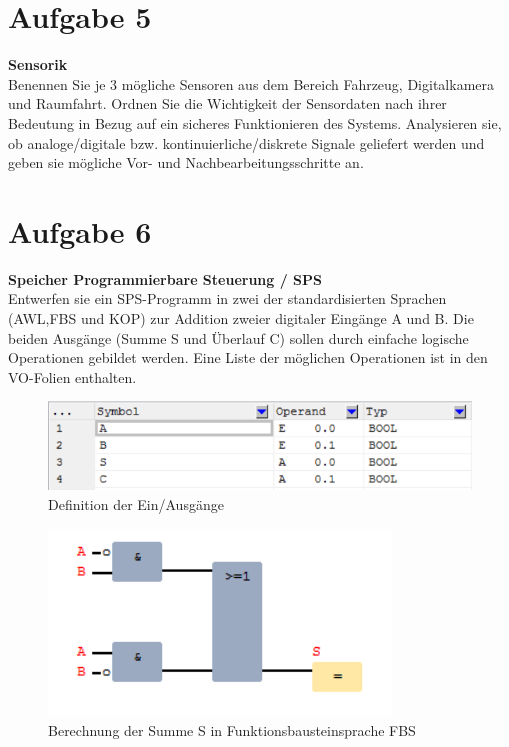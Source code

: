 \documentclass[12pt,a4paper,ngerman]{article}
\begin{document}
\section{Aufgabe 5}
\begin{framed}
\textbf{Sensorik} \\
Benennen Sie je 3 mögliche Sensoren aus dem Bereich Fahrzeug, Digitalkamera und Raumfahrt. Ordnen Sie die Wichtigkeit der Sensordaten nach ihrer Bedeutung in Bezug auf ein sicheres Funktionieren des Systems. Analysieren sie, ob analoge/digitale bzw. kontinuierliche/diskrete Signale geliefert werden und geben sie mögliche Vor- und Nachbearbeitungsschritte an. 
\end{framed}

\pagebreak

\section{Aufgabe 6}
\begin{framed}
\textbf{Speicher Programmierbare Steuerung / SPS} \\
Entwerfen sie ein SPS-Programm in zwei der standardisierten Sprachen (AWL,FBS und KOP) zur Addition zweier digitaler Eingänge A und B. Die beiden Ausgänge (Summe S und Überlauf C) sollen durch einfache logische Operationen gebildet werden. Eine Liste der möglichen Operationen ist in den VO-Folien enthalten.
\end{framed}
   
\begin{figure}[h!]
\centering
\includegraphics[scale=1]{figures/Aufg6_EA.png} 
\caption{Definition der Ein/Ausgänge}
\end{figure}

\begin{figure}[h!]
\centering
\includegraphics[scale=1]{figures/Aufg6_S_FUP.png} 
\caption{Berechnung der Summe S in Funktionsbausteinsprache FBS}
\end{figure}
\end{document}
